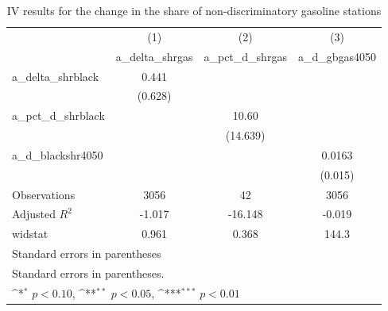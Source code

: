 \begin{table}[htbp]\centering
\def\sym#1{\ifmmode^{#1}\else\(^{#1}\)\fi}
\caption{IV results for the change in the share of non-discriminatory gasoline stations}
\begin{tabular}{l*{3}{c}}
\hline\hline
                    &\multicolumn{1}{c}{(1)}&\multicolumn{1}{c}{(2)}&\multicolumn{1}{c}{(3)}\\
                    &\multicolumn{1}{c}{a\_delta\_shrgas}&\multicolumn{1}{c}{a\_pct\_d\_shrgas}&\multicolumn{1}{c}{a\_d\_gbgas4050}\\
\hline
a\_delta\_shrblack    &       0.441         &                     &                     \\
                    &     (0.628)         &                     &                     \\
[1em]
a\_pct\_d\_shrblack    &                     &       10.60         &                     \\
                    &                     &    (14.639)         &                     \\
[1em]
a\_d\_blackshr4050    &                     &                     &      0.0163         \\
                    &                     &                     &     (0.015)         \\
\hline
Observations        &        3056         &          42         &        3056         \\
Adjusted \(R^{2}\)  &      -1.017         &     -16.148         &      -0.019         \\
widstat             &       0.961         &       0.368         &       144.3         \\
\hline\hline
\multicolumn{4}{l}{\footnotesize Standard errors in parentheses}\\
\multicolumn{4}{l}{\footnotesize Standard errors in parentheses.}\\
\multicolumn{4}{l}{\footnotesize \sym{*} \(p<0.10\), \sym{**} \(p<0.05\), \sym{***} \(p<0.01\)}\\
\end{tabular}
\end{table}

